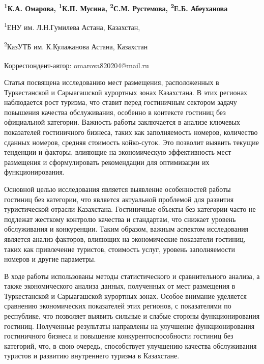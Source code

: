 
\begin{articleheader}

{\bfseries
\textsuperscript{1}К.А. Омарова\textsuperscript{\envelope },
\textsuperscript{1}К.П. Мусина,
\textsuperscript{2}С.М. Рустемова,
\textsuperscript{2}Е.Б. Абеуханова
}
\end{articleheader}

\begin{affiliation}
\textsuperscript{1}ЕНУ им. Л.Н.Гумилева Астана, Казахстан,

\textsuperscript{2}КазУТБ им. К.Кулажанова Астана, Казахстан

\raggedright \textsuperscript{\envelope } Корреспондент-автор: omarova820204@mail.ru
\end{affiliation}

Статья посвящена исследованию мест размещения, расположенных в
Туркестанской и Сарыагашской курортных зонах Казахстана. В этих регионах
наблюдается рост туризма, что ставит перед гостиничным сектором задачу
повышения качества обслуживания, особенно в контексте гостиниц без
официальной категории. Важность работы заключается в анализе ключевых
показателей гостиничного бизнеса, таких как заполняемость номеров,
количество сданных номеров, средняя стоимость койко-суток. Это позволит
выявить текущие тенденции и факторы, влияющие на экономическую
эффективность мест размещения и сформулировать рекомендации для
оптимизации их функционирования.

Основной целью исследования является выявление особенностей работы
гостиниц без категории, что является актуальной проблемой для развития
туристической отрасли Казахстана. Гостиничные объекты без категории
часто не подлежат жесткому контролю качества и стандартам, что снижает
уровень обслуживания и конкуренции. Таким образом, важным аспектом
исследования является анализ факторов, влияющих на экономические
показатели гостиниц, таких как привлечение туристов, стоимость услуг,
уровень заполняемости номеров и другие параметры.

В ходе работы использованы методы статистического и сравнительного
анализа, а также экономического анализа данных, полученных от мест
размещения в Туркестанской и Сарыагашской курортных зонах. Особое
внимание уделяется сравнению экономических показателей этих регионов, с
показателями по республике, что позволяет выявить сильные и слабые
стороны функционирования гостиниц. Полученные результаты направлены на
улучшение функционирования гостиничного бизнеса и повышение
конкурентоспособности гостиниц без категорий, что, в свою очередь,
способствует улучшению качества обслуживания туристов и развитию
внутреннего туризма в Казахстане.

